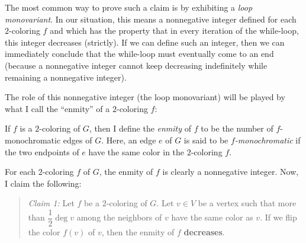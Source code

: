 \documentclass[paper=a4, fontsize=12pt]{scrartcl} %
\newcommand{\tup}[1]{\left( #1 \right)}
\theoremstyle{plainsl}
\theoremstyle{definition}
\theoremstyle{remark}
\newenvironment{statement}{\begin{quote}}{\end{quote}}
\begin{document}
The most common way to prove such a claim is by exhibiting a
\textit{loop monovariant}. In our situation, this means a nonnegative
integer defined for each $2$-coloring $f$ and which has the property
that in every iteration of the while-loop, this integer decreases
(strictly). If we can define such an integer, then we can immediately
conclude that the while-loop must eventually come to an end (because
a nonnegative integer cannot keep decreasing indefinitely while
remaining a nonnegative integer).

The role of this nonnegative integer (the loop monovariant) will be
played by what I call the ``enmity'' of a $2$-coloring $f$:

If $f$ is a $2$-coloring of $G$, then I define the \textit{enmity} of
$f$ to be the number of $f$-monochromatic edges of $G$. Here, an edge
$e$ of $G$ is said to be \textit{$f$-monochromatic} if the two
endpoints of $e$ have the same color in the $2$-coloring $f$.

For each $2$-coloring $f$ of $G$, the enmity of $f$ is clearly a
nonnegative integer. Now, I claim the following:
\begin{statement}
\textit{Claim 1:} Let $f$ be a $2$-coloring of $G$. Let $v \in V$ be
a vertex such that more than $\dfrac{1}{2} \deg v$ among the neighbors
of $v$ have the same color as $v$. If we flip the color $f \tup{v}$ of
$v$, then the enmity of $f$ \textbf{decreases}.
\end{statement}
\end{document}
